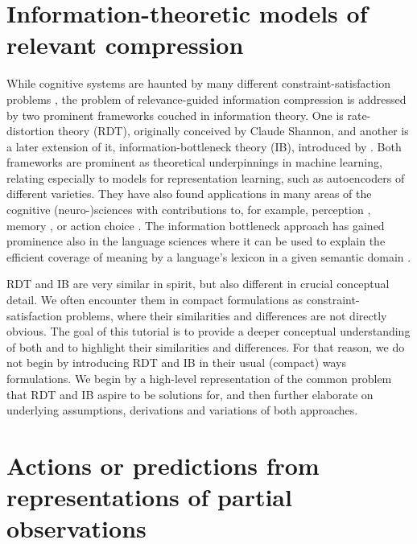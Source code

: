 \documentclass[nobib,nofonts]{tufte-handout}
\begin{document}
\section{Information-theoretic models of relevant compression}

While cognitive systems are haunted by many different constraint-satisfaction problems \citep{Del-GiudiceCrespi2018:Basic-functiona}, the problem of relevance-guided information compression is addressed by two prominent frameworks couched in information theory.
One is rate-distortion theory (RDT), originally conceived by Claude Shannon, and another is a later extension of it, information-bottleneck theory (IB), introduced by \citet{TishbyPereira2000:The-information}.
Both frameworks are prominent as theoretical underpinnings in machine learning, relating especially to models for representation learning, such as autoencoders of different varieties.
They have also found applications in many areas of the cognitive (neuro-)sciences with contributions to, for example, perception \citep{Sims2016:Ratedistortion-,Sims2018:Efficient-codin}, memory \citep{Gershman2024:The-Rational-An}, or action choice \citep{LaiGershman2024:Human-decision-}.
The information bottleneck approach has gained prominence also in the language sciences where it can be used to explain the efficient coverage of meaning by a language's lexicon in a given semantic domain \citep[e.g.,][]{ZaslavskyKemp2018:Efficient-compr}.

RDT and IB are very similar in spirit, but also different in crucial conceptual detail.
We often encounter them in compact formulations as constraint-satisfaction problems, where their similarities and differences are not directly obvious.
The goal of this tutorial is to provide a deeper conceptual understanding of both and to highlight their similarities and differences.
For that reason, we do not begin by introducing RDT and IB in their usual (compact) ways formulations.
We begin by a high-level representation of the common problem that RDT and IB aspire to be solutions for, and then further elaborate on underlying assumptions, derivations and variations of both approaches.

\section{Actions or predictions from representations of partial observations}
\end{document}
